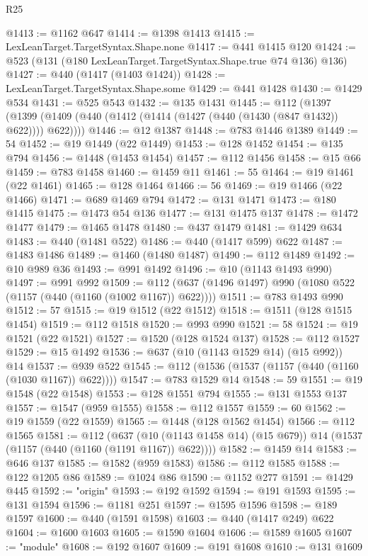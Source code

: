 \begin{lexlean}{R25}
\begin{coremodule}
@1413 := @1162 @647
@1414 := @1398 @1413
@1415 := LexLeanTarget.TargetSyntax.Shape.none
@1417 := @441 @1415 @120
@1424 := @523 (@131 (@180 LexLeanTarget.TargetSyntax.Shape.true @74 @136) @136)
@1427 := @440 (@1417 (@1403 @1424))
@1428 := LexLeanTarget.TargetSyntax.Shape.some
@1429 := @441 @1428
@1430 := @1429 @534
@1431 := @525 @543
@1432 := @135 @1431
@1445 := @112
    (@1397 (@1399 (@1409 (@440 (@1412 (@1414 (@1427 (@440 (@1430 (@847 @1432)) @622)))) @622))))
@1446 := @12 @1387
@1448 := @783 @1446 @1389
@1449 := 54
@1452 := @19 @1449 (@22 @1449)
@1453 := @128 @1452
@1454 := @135 @794
@1456 := @1448 (@1453 @1454)
@1457 := @112 @1456
@1458 := @15 @66
@1459 := @783 @1458
@1460 := @1459 @11
@1461 := 55
@1464 := @19 @1461 (@22 @1461)
@1465 := @128 @1464
@1466 := 56
@1469 := @19 @1466 (@22 @1466)
@1471 := @689 @1469 @794
@1472 := @131 @1471
@1473 := @180 @1415
@1475 := @1473 @54 @136
@1477 := @131 @1475 @137
@1478 := @1472 @1477
@1479 := @1465 @1478
@1480 := @437 @1479
@1481 := @1429 @634
@1483 := @440 (@1481 @522)
@1486 := @440 (@1417 @599) @622
@1487 := @1483 @1486
@1489 := @1460 (@1480 @1487)
@1490 := @112 @1489
@1492 := @10 @989 @36
@1493 := @991 @1492
@1496 := @10 (@1143 @1493 @990)
@1497 := @991 @992
@1509 := @112 (@637 (@1496 @1497) @990 (@1080 @522 (@1157 (@440 (@1160 (@1002 @1167)) @622))))
@1511 := @783 @1493 @990
@1512 := 57
@1515 := @19 @1512 (@22 @1512)
@1518 := @1511 (@128 @1515 @1454)
@1519 := @112 @1518
@1520 := @993 @990
@1521 := 58
@1524 := @19 @1521 (@22 @1521)
@1527 := @1520 (@128 @1524 @137)
@1528 := @112 @1527
@1529 := @15 @1492
@1536 := @637 (@10 (@1143 @1529 @14) (@15 @992)) @14
@1537 := @939 @522
@1545 := @112 (@1536 (@1537 (@1157 (@440 (@1160 (@1030 @1167)) @622))))
@1547 := @783 @1529 @14
@1548 := 59
@1551 := @19 @1548 (@22 @1548)
@1553 := @128 @1551 @794
@1555 := @131 @1553 @137
@1557 := @1547 (@959 @1555)
@1558 := @112 @1557
@1559 := 60
@1562 := @19 @1559 (@22 @1559)
@1565 := @1448 (@128 @1562 @1454)
@1566 := @112 @1565
@1581 := @112
    (@637 (@10 (@1143 @1458 @14) (@15 @679)) @14 (@1537 (@1157 (@440 (@1160 (@1191 @1167)) @622))))
@1582 := @1459 @14
@1583 := @646 @137
@1585 := @1582 (@959 @1583)
@1586 := @112 @1585
@1588 := @122 @1205 @86
@1589 := @1024 @86
@1590 := @1152 @277
@1591 := @1429 @445
@1592 := "origin"
@1593 := @192 @1592
@1594 := @191 @1593
@1595 := @131 @1594
@1596 := @1181 @251
@1597 := @1595 @1596
@1598 := @189 @1597
@1600 := @440 (@1591 @1598)
@1603 := @440 (@1417 @249) @622
@1604 := @1600 @1603
@1605 := @1590 @1604
@1606 := @1589 @1605
@1607 := "module"
@1608 := @192 @1607
@1609 := @191 @1608
@1610 := @131 @1609

\end{coremodule}
\end{lexlean}
